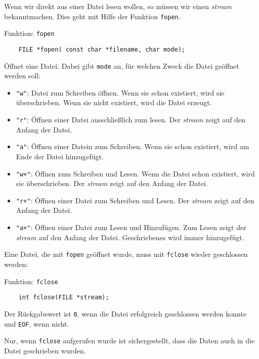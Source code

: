 Wenn wir direkt aus einer Datei lesen wollen, so müssen wir einen \emph{stream} bekanntmachen.
Dies geht mit Hilfe der Funktion \verb|fopen|.
\begin{myexampleblock}{Funktion: \texttt{fopen}}
  \begin{lstlisting}
    FILE *fopen( const char *filename, char mode);
  \end{lstlisting}
  \vspace{-0.4cm}
  Öffnet eine Datei. Dabei gibt \texttt{mode} an, für welchen Zweck die Datei geöffnet werden soll:
  \begin{itemize} 
    \itemsep0.5ex
  \item \texttt{"w"}: Datei zum Schreiben öffnen. Wenn sie schon existiert, wird sie überschrieben. Wenn sie nicht existiert, wird die Datei erzeugt.
  \item \texttt{"r"}: Öffnen einer Datei ausschließlich zum lesen. Der \emph{stream} zeigt auf den Anfang der Datei.
  \item \texttt{"{}a"}: Öffnen einer Datein zum Schreiben. Wenn sie schon existiert, wird am Ende der Datei hinzugefügt.
  \item \texttt{"w+"}: Öffnen zum Schreiben und Lesen. Wenn die Datei schon existiert, wird sie überschrieben. Der \emph{stream} zeigt auf den Anfang der Datei.
  \item \texttt{"r+"}: Öffnen einer Datei zum Schreiben und Lesen. Der \emph{stream} zeigt auf den Anfang der Datei.
  \item \texttt{"{}a+"}: Öffnen einer Datei zum Lesen und Hinzufügen. Zum Lesen zeigt der \emph{stream} auf den Anfang der Datei. Geschriebenes wird immer hinzugefügt.
  \end{itemize}
\end{myexampleblock}  
Eine Datei, die mit \texttt{fopen} geöffnet wurde, muss mit \texttt{fclose} wieder geschlossen werden:
\begin{myexampleblock}{Funktion: \texttt{fclose}}
  \begin{lstlisting}
    int fclose(FILE *stream);
  \end{lstlisting}
  \vspace{-0.4cm}
  Der Rückgabewert ist \texttt{0}, wenn die Datei erfolgreich geschlossen werden konnte und \texttt{EOF}, wenn nicht.
\end{myexampleblock}
Nur, wenn \texttt{fclose} aufgerufen wurde ist sichergestellt, dass die Daten auch in die Datei geschrieben wurden.

